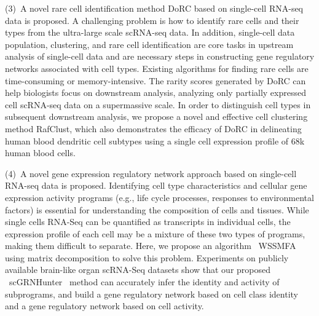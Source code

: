 \begin{abstracten}
(3)~A novel rare cell identification method DoRC based on single-cell RNA-seq data is proposed.
A challenging problem is how to identify rare cells and their types from the ultra-large scale scRNA-seq data. 
In addition, single-cell data population, clustering, and rare cell identification are core tasks in upstream analysis of single-cell data and are necessary steps in constructing gene regulatory networks associated with cell types. 
Existing algorithms for finding rare cells are time-consuming or memory-intensive.
The rarity scores generated by DoRC can help biologists focus on downstream analysis, 
analyzing only partially expressed cell scRNA-seq data on a supermassive scale. 
In order to distinguish cell types in subsequent downstream analysis, we propose a novel and effective cell clustering method RafClust, 
which also demonstrates the efficacy of DoRC in delineating human blood dendritic cell subtypes using a single cell expression profile of 68k human blood cells. 

(4)~A novel gene expression regulatory network approach based on single-cell RNA-seq data is proposed. 
Identifying cell type characteristics and cellular gene expression activity programs (e.g., life cycle processes, responses to environmental factors) is essential for understanding the composition of cells and tissues. 
While single cells RNA-Seq can be quantified as transcripts in individual cells, 
the expression profile of each cell may be a mixture of these two types of programs, 
making them difficult to separate. 
Here, we propose an algorithm ~WSSMFA~ using matrix decomposition to solve this problem. 
Experiments on publicly available brain-like organ scRNA-Seq datasets show that our proposed ~scGRNHunter~ method can accurately infer the identity and activity of subprograms, 
and build a gene regulatory network based on cell class identity and a gene regulatory network based on cell activity.

\end{abstracten}
